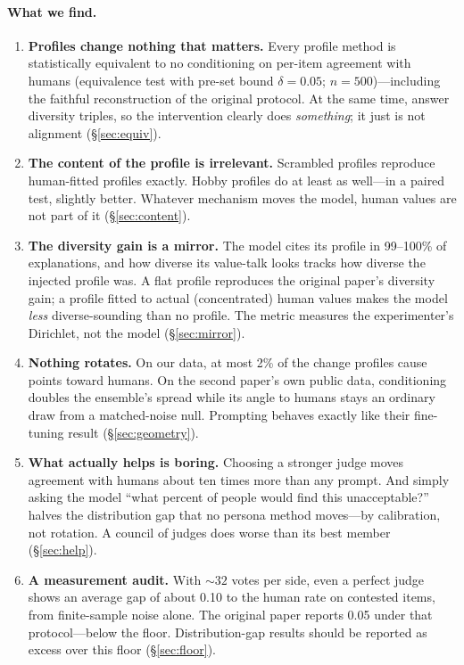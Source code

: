 \documentclass{article}
\begin{document}
\paragraph{What we find.}
\begin{enumerate}
  \item \textbf{Profiles change nothing that matters.} Every profile method is statistically equivalent to no conditioning on per-item agreement with humans (equivalence test with pre-set bound $\delta=0.05$; $n=500$)---including the faithful reconstruction of the original protocol. At the same time, answer diversity triples, so the intervention clearly does \emph{something}; it just is not alignment (\S\ref{sec:equiv}).
  \item \textbf{The content of the profile is irrelevant.} Scrambled profiles reproduce human-fitted profiles exactly. Hobby profiles do at least as well---in a paired test, slightly better. Whatever mechanism moves the model, human values are not part of it (\S\ref{sec:content}).
  \item \textbf{The diversity gain is a mirror.} The model cites its profile in 99--100\% of explanations, and how diverse its value-talk looks tracks how diverse the injected profile was. A flat profile reproduces the original paper's diversity gain; a profile fitted to actual (concentrated) human values makes the model \emph{less} diverse-sounding than no profile. The metric measures the experimenter's Dirichlet, not the model (\S\ref{sec:mirror}).
  \item \textbf{Nothing rotates.} On our data, at most 2\% of the change profiles cause points toward humans. On the second paper's own public data, conditioning doubles the ensemble's spread while its angle to humans stays an ordinary draw from a matched-noise null. Prompting behaves exactly like their fine-tuning result (\S\ref{sec:geometry}).
  \item \textbf{What actually helps is boring.} Choosing a stronger judge moves agreement with humans about ten times more than any prompt. And simply asking the model ``what percent of people would find this unacceptable?'' halves the distribution gap that no persona method moves---by calibration, not rotation. A council of judges does worse than its best member (\S\ref{sec:help}).
  \item \textbf{A measurement audit.} With ${\sim}32$ votes per side, even a perfect judge shows an average gap of about 0.10 to the human rate on contested items, from finite-sample noise alone. The original paper reports 0.05 under that protocol---below the floor. Distribution-gap results should be reported as excess over this floor (\S\ref{sec:floor}).
\end{enumerate}
\end{document}
